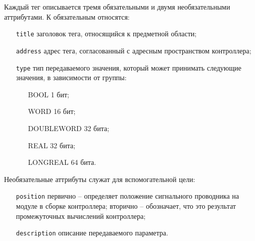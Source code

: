 Каждый тег описывается тремя обязательными и двумя необязательными аттрибутами.
К обязательным относятся:
\begin{itemize}
    \item[\texttt{title}] заголовок тега, относящийся к предметной области;
    \item[\texttt{address}] адрес тега, согласованный с адресным пространством контроллера;
    \item[\texttt{type}] тип передаваемого значения, который может принимать следующие значения, в зависимости от группы:
    \begin{itemize}
        \item[BOOL] 1 бит;
        \item[WORD] 16 бит;
        \item[DOUBLEWORD] 32 бита;
        \item[REAL] 32 бита;
        \item[LONGREAL] 64 бита.
    \end{itemize}
\end{itemize}
Необязательные аттрибуты служат для вспомогательной цели:
\begin{itemize}
    \item[\texttt{position}] первично -- определяет положение сигнального проводника на модуле в сборке контроллера;
    вторично -- обозначает, что это результат промежуточных вычислений контроллера;
    \item[\texttt{description}] описание передаваемого параметра.
\end{itemize}



